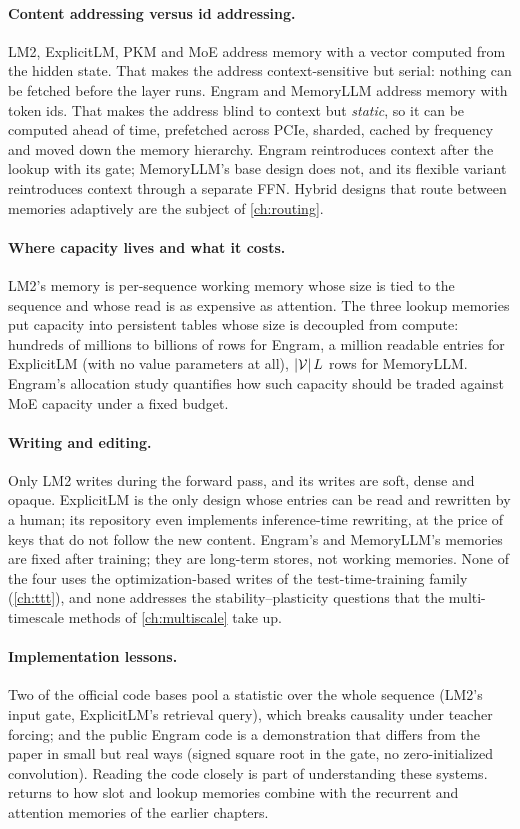 \paragraph{Content addressing versus id addressing.} LM2, ExplicitLM, PKM and MoE address memory
with a vector computed from the hidden state. That makes the address context-sensitive but serial:
nothing can be fetched before the layer runs. Engram and MemoryLLM address memory with token ids.
That makes the address blind to context but \emph{static}, so it can be computed ahead of time,
prefetched across PCIe, sharded, cached by frequency and moved down the memory hierarchy. Engram
reintroduces context after the lookup with its gate; MemoryLLM's base design does not, and its
flexible variant reintroduces context through a separate FFN. Hybrid designs that route between
memories adaptively are the subject of \cref{ch:routing}.

\paragraph{Where capacity lives and what it costs.} LM2's memory is per-sequence working memory
whose size is tied to the sequence and whose read is as expensive as attention. The three lookup
memories put capacity into persistent tables whose size is decoupled from compute: hundreds of
millions to billions of rows for Engram, a million readable entries for ExplicitLM (with no value
parameters at all), $\left\lvert \mathcal{V}\right\rvert L$ rows for MemoryLLM. Engram's allocation study
quantifies how such capacity should be traded against MoE capacity under a fixed budget.

\paragraph{Writing and editing.} Only LM2 writes during the forward pass, and its writes are soft,
dense and opaque. ExplicitLM is the only design whose entries can be read and rewritten by a human;
its repository even implements inference-time rewriting, at the price of keys that do not follow
the new content. Engram's and MemoryLLM's memories are fixed after training; they are long-term
stores, not working memories. None of the four uses the optimization-based writes of the
test-time-training family (\cref{ch:ttt}), and none addresses the stability--plasticity questions
that the multi-timescale methods of \cref{ch:multiscale} take up.

\paragraph{Implementation lessons.} Two of the official code bases pool a statistic over the whole
sequence (LM2's input gate, ExplicitLM's retrieval query), which breaks causality under teacher
forcing; and the public Engram code is a demonstration that differs from the paper in small but
real ways (signed square root in the gate, no zero-initialized convolution). Reading the code
closely is part of understanding these systems.  returns to how slot and lookup
memories combine with the recurrent and attention memories of the earlier chapters.

